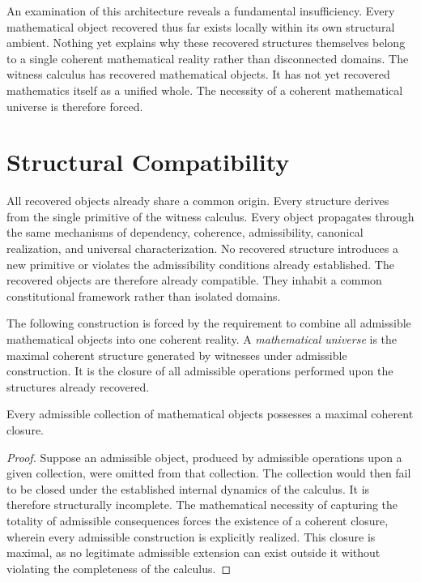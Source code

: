 \documentclass[12pt,anyside]{book}
\newcommand{\term}[1]{\textit{#1}}             %
\begin{document}
An examination of this architecture reveals a fundamental insufficiency. Every mathematical object recovered thus far exists locally within its own structural ambient. Nothing yet explains why these recovered structures themselves belong to a single coherent mathematical reality rather than disconnected domains. The witness calculus has recovered mathematical objects. It has not yet recovered mathematics itself as a unified whole. The necessity of a coherent mathematical universe is therefore forced.

\section{Structural Compatibility}
All recovered objects already share a common origin. Every structure derives from the single primitive of the witness calculus. Every object propagates through the same mechanisms of dependency, coherence, admissibility, canonical realization, and universal characterization. No recovered structure introduces a new primitive or violates the admissibility conditions already established. The recovered objects are therefore already compatible. They inhabit a common constitutional framework rather than isolated domains.

The following construction is forced by the requirement to combine all admissible mathematical objects into one coherent reality. A \term{mathematical universe} is the maximal coherent structure generated by witnesses under admissible construction. It is the closure of all admissible operations performed upon the structures already recovered.

\begin{theorem}
Every admissible collection of mathematical objects possesses a maximal coherent closure.
\end{theorem}

\begin{proof}
Suppose an admissible object, produced by admissible operations upon a given collection, were omitted from that collection. The collection would then fail to be closed under the established internal dynamics of the calculus. It is therefore structurally incomplete. The mathematical necessity of capturing the totality of admissible consequences forces the existence of a coherent closure, wherein every admissible construction is explicitly realized. This closure is maximal, as no legitimate admissible extension can exist outside it without violating the completeness of the calculus.
\end{proof}
\end{document}
